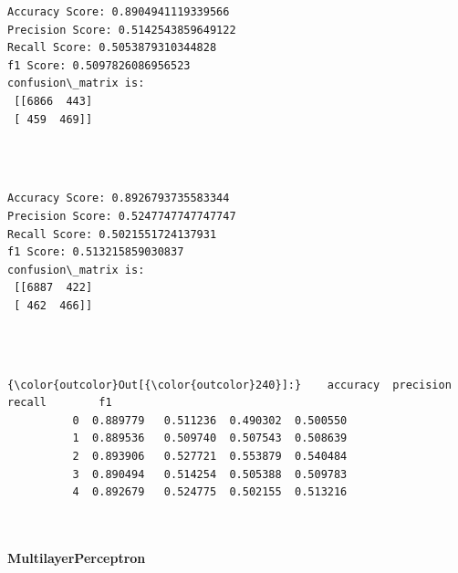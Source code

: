 \documentclass[11pt]{article}
\begin{document}
    \begin{Verbatim}[commandchars=\\\{\}]
Accuracy Score: 0.8904941119339566
Precision Score: 0.5142543859649122
Recall Score: 0.5053879310344828
f1 Score: 0.5097826086956523
confusion\_matrix is: 
 [[6866  443]
 [ 459  469]] 


    \end{Verbatim}

    \begin{center}
    \end{center}
    { \hspace*{\fill} \\}
    
    \begin{Verbatim}[commandchars=\\\{\}]
Accuracy Score: 0.8926793735583344
Precision Score: 0.5247747747747747
Recall Score: 0.5021551724137931
f1 Score: 0.513215859030837
confusion\_matrix is: 
 [[6887  422]
 [ 462  466]] 


    \end{Verbatim}

    \begin{center}
    \end{center}
    { \hspace*{\fill} \\}
    
\begin{Verbatim}[commandchars=\\\{\}]
{\color{outcolor}Out[{\color{outcolor}240}]:}    accuracy  precision    recall        f1
          0  0.889779   0.511236  0.490302  0.500550
          1  0.889536   0.509740  0.507543  0.508639
          2  0.893906   0.527721  0.553879  0.540484
          3  0.890494   0.514254  0.505388  0.509783
          4  0.892679   0.524775  0.502155  0.513216
\end{Verbatim}
            
    \begin{center}
    \end{center}
    { \hspace*{\fill} \\}
    
    \paragraph{MultilayerPerceptron}\label{multilayerperceptron}
\end{document}
